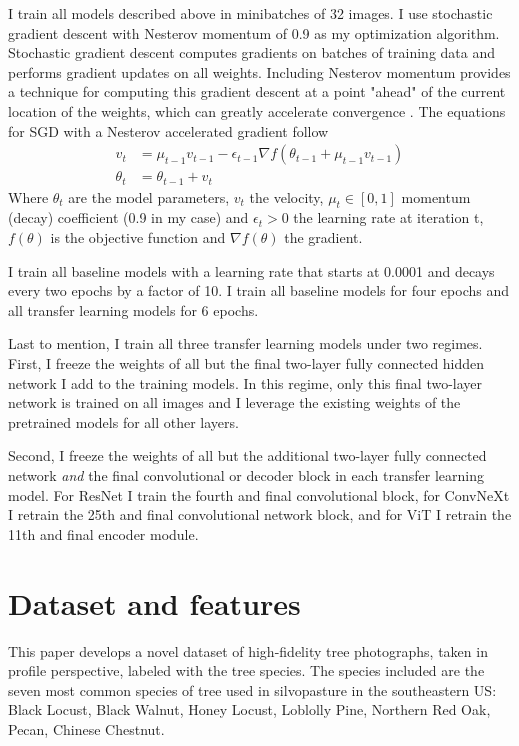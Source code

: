 \documentclass[10pt,twocolumn,letterpaper]{article}
\begin{document}
I train all models described above in minibatches of 32 images. I use stochastic gradient descent with Nesterov momentum of 0.9 as my optimization algorithm. Stochastic gradient descent computes gradients on batches of training data and performs gradient updates on all weights. Including Nesterov momentum provides a technique for computing this gradient descent at a point "ahead" of the current location of the weights, which can greatly accelerate convergence \cite{nesterov}. The equations for SGD with a Nesterov accelerated gradient follow
\begin{align*}
  v_t &= \mu_{t-1}v_{t-1} - \epsilon_{t-1}\nabla f(\theta_{t-1} + \mu_{t-1}v_{t-1})\\
  \theta_t &= \theta_{t-1} + v_t
\end{align*}
Where $\theta_t$ are the model parameters, $v_t$ the velocity, $\mu_t \in [0,1]$ momentum (decay) coefficient (0.9 in my case) and $\epsilon_t > 0$ the learning rate at iteration t, $f(\theta)$ is the objective function and $\nabla f(\theta)$ the gradient.

I train all baseline models with a learning rate that starts at 0.0001 and decays every two epochs by a factor of 10. I train all baseline models for four epochs and all transfer learning models for 6 epochs.

Last to mention, I train all three transfer learning models under two regimes. First, I freeze the weights of all but the final two-layer fully connected hidden network I add to the training models. In this regime, only this final two-layer network is trained on all images and I leverage the existing weights of the pretrained models for all other layers. 

Second, I freeze the weights of all but the additional two-layer fully connected network \textit{and} the final convolutional or decoder block in each transfer learning model. For ResNet I train the fourth and final convolutional block, for ConvNeXt I retrain the 25th and final convolutional network block, and for ViT I retrain the 11th and final encoder module.

\section{Dataset and features}
\label{sec:data}
This paper develops a novel dataset of high-fidelity tree photographs, taken in profile perspective, labeled with the tree species. The species included are the seven most common species of tree used in silvopasture in the southeastern US: Black Locust, Black Walnut, Honey Locust, Loblolly Pine, Northern Red Oak, Pecan, Chinese Chestnut. 
\end{document}
